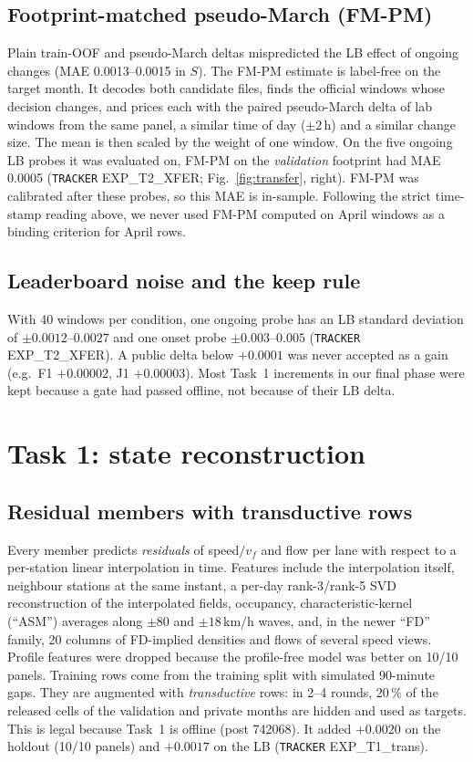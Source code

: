 \documentclass[conference,10pt]{IEEEtran}
\newcommand{\file}[1]{\texttt{\small #1}}
\begin{document}
\subsection{Footprint-matched pseudo-March (FM-PM)}
Plain train-OOF and pseudo-March deltas mispredicted the LB effect of ongoing changes (MAE 0.0013--0.0015 in $S$). The FM-PM
estimate is label-free on the target month. It decodes both candidate files, finds the official windows whose decision changes,
and prices each with the paired pseudo-March delta of lab windows from the same panel, a similar time of day ($\pm2$\,h) and a similar change
size. The mean is then scaled by the weight of one window. On the five ongoing LB probes it was evaluated on, FM-PM on the
\emph{validation} footprint had MAE 0.0005 (\file{TRACKER} EXP\_T2\_XFER; Fig.~\ref{fig:transfer}, right). FM-PM was
calibrated after these probes, so this MAE is in-sample. Following the strict time-stamp reading above, we never used FM-PM
computed on April windows as a binding criterion for April rows.

\subsection{Leaderboard noise and the keep rule}
With 40 windows per condition, one ongoing probe has an LB standard deviation of $\pm0.0012$--$0.0027$ and one onset probe
$\pm0.003$--$0.005$ (\file{TRACKER} EXP\_T2\_XFER). A public delta below $+0.0001$ was never accepted as a gain (e.g.\ F1 $+0.00002$, J1
$+0.00003$). Most Task~1 increments in our final phase were kept because a gate had passed offline, not because of their LB delta.

\section{Task 1: state reconstruction}\label{sec:t1}
\subsection{Residual members with transductive rows}
Every member predicts \emph{residuals} of speed$/v_f$ and flow per lane with respect to a per-station linear interpolation in time.
Features include the interpolation itself, neighbour stations at the same instant, a per-day rank-3/rank-5 SVD reconstruction of the
interpolated fields, occupancy, characteristic-kernel (``ASM'') averages along $\pm80$ and $\pm18$\,km/h waves, and, in the newer
``FD'' family, 20 columns of FD-implied densities and flows of several speed views. Profile features were dropped because the
profile-free model was better on 10/10 panels. Training rows come from the training split with simulated 90-minute gaps. They are
augmented with \emph{transductive} rows: in 2--4 rounds, 20\,\% of the released cells of the validation and private months are hidden
and used as targets. This is legal because Task~1 is offline (post 742068). It added $+0.0020$ on the holdout (10/10 panels) and
$+0.0017$ on the LB (\file{TRACKER} EXP\_T1\_trans).
\end{document}
